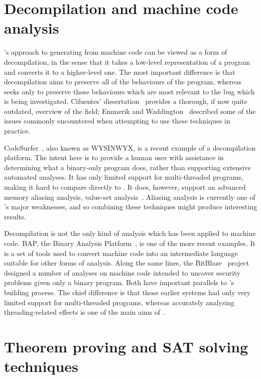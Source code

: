 \section{Decompilation and machine code analysis}

{\Technique}'s approach to generating {\StateMachines} from machine
code can be viewed as a form of decompilation, in the sense that it
takes a low-level representation of a program and converts it to a
higher-level one.  The most important difference is that decompilation
aims to preserve all of the behaviours of the program, whereas
{\technique} seeks only to preserve those behaviours which are most
relevant to the bug which is being investigated.  Cifuentes'
dissertation~\cite{Cifuentes1994} provides a thorough, if now quite
outdated, overview of the field; Emmerik and
Waddington~\cite{Emmerik2004} described some of the issues commonly
encountered when attempting to use these techniques in practice.

CodeSurfer~\cite{Balakrishnan2008,Balakrishnan2005a}, also known as
WYSINWYX, is a recent example of a decompilation platform.  The intent
here is to provide a human user with assistance in determining what a
binary-only program does, rather than supporting extensive automated
analyses.  It has only limited support for multi-threaded programs,
making it hard to compare directly to {\technique}.  It does, however,
support an advanced memory aliasing analysis, value-set
analysis~\cite{Balakrishnan2004}.  Aliasing analysis is currently one
of {\technique}'s major weaknesses, and so combining these techniques
might produce interesting results.

Decompilation is not the only kind of analysis which has been applied
to machine code.  BAP, the Binary Analysis
Platform~\cite{Brumley2011}, is one of the more recent examples.  It
is a set of tools used to convert machine code into an intermediate
language suitable for other forms of analysis.  Along the same lines,
the BitBlaze~\cite{Song2008} project designed a number of analyses on
machine code intended to uncover security problems given only a binary
program.  Both have important parallels to {\technique}'s
{\StateMachine} building process.  The chief difference is that those
earlier systems had only very limited support for multi-threaded
programs, whereas accurately analysing threading-related effects is
one of the main aims of {\technique}.

\section{Theorem proving and SAT solving techniques}

